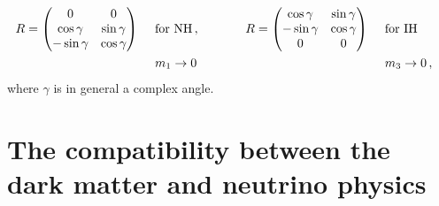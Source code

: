 \documentclass[12pt,letterpaper]{article}
\begin{document}
\begin{align}
\label{eq:R-matrix}
R=\begin{pmatrix}
0 & 0 \\
\cos\gamma & \sin\gamma \\
-\sin\gamma & \cos\gamma
\end{pmatrix}\hspace{0.5 cm} &\text{for NH}\,,&\hspace{1.0 cm}
R=\begin{pmatrix}
\cos\gamma & \sin\gamma \\
-\sin\gamma & \cos\gamma \\
0 & 0
\end{pmatrix}\hspace{0.5 cm} &\text{for IH}& \nonumber \\
&m_1 \rightarrow 0&   &m_3 \rightarrow 0\,,& 
\end{align}
where $\gamma$ is in general a complex angle.



\section{The compatibility between the dark matter and neutrino physics}
\label{sec:full-scan}
\end{document}
